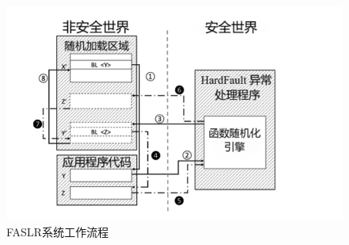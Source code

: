 \documentclass[UTF8,12pt,a4paper,twoside]{ctexart}
\numberwithin{figure}{section}
\begin{document}
\begin{figure}[H]
    \centering
    \includegraphics[scale=0.4]{graph/workflow.png}
    \caption{FASLR系统工作流程}
    \label{fig:workflow}
\end{figure}
\end{document}
